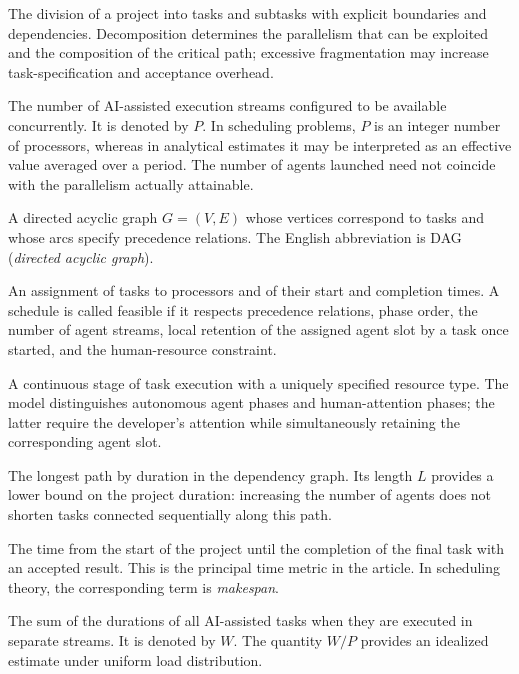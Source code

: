 \begin{description}[style=nextline]
  \item[Decomposition] The division of a project into tasks and subtasks with
  explicit boundaries and dependencies. Decomposition determines the
  parallelism that can be exploited and the composition of the critical path;
  excessive fragmentation may increase task-specification and acceptance
  overhead.

  \item[Parallelism] The number of AI-assisted execution streams configured to
  be available concurrently. It is denoted by $P$. In scheduling problems, $P$
  is an integer number of processors, whereas in analytical estimates it may be
  interpreted as an effective value averaged over a period. The number of
  agents launched need not coincide with the parallelism actually attainable.

  \item[Dependency Graph] A directed acyclic graph $G=(V,E)$ whose vertices
  correspond to tasks and whose arcs specify precedence relations. The English
  abbreviation is DAG (\emph{directed acyclic graph}).

  \item[Schedule] An assignment of tasks to processors and of their start and
  completion times. A schedule is called feasible if it respects precedence
  relations, phase order, the number of agent streams, local retention of the
  assigned agent slot by a task once started, and the human-resource constraint.

  \item[Task Phase] A continuous stage of task execution with a uniquely
  specified resource type. The model distinguishes autonomous agent phases and
  human-attention phases; the latter require the developer's attention while
  simultaneously retaining the corresponding agent slot.

  \item[Critical Path] The longest path by duration in the dependency graph.
  Its length $L$ provides a lower bound on the project duration: increasing the
  number of agents does not shorten tasks connected sequentially along this
  path.

  \item[Makespan] The time from the start of the project until the completion of
  the final task with an accepted result. This is the principal time metric in
  the article. In scheduling theory, the corresponding term is
  \emph{makespan}.

  \item[Total Work] The sum of the durations of all AI-assisted tasks when they
  are executed in separate streams. It is denoted by $W$. The quantity $W/P$
  provides an idealized estimate under uniform load distribution.


\end{description}
